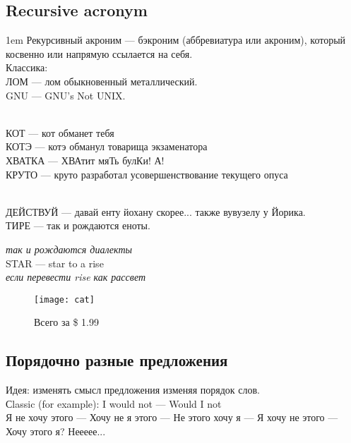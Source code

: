 \subsection{Recursive acronym}
\begin{flushleft}\parskip1em
    Рекурсивный акроним --- бэкроним (аббревиатура или акроним), который косвенно или напрямую ссылается на себя.\\
    Классика:\\
    ЛОМ --- лом обыкновенный металлический.\\
    GNU --- GNU's Not UNIX.

    \emph{}\\
    КОТ --- кот обманет тебя\\
    КОТЭ --- котэ обманул товарища экзаменатора\\
    ХВАТКА --- ХВАтит мяТь булКи! А!\\
    КРУТО --- круто разработал усовершенствование текущего опуса

    \emph{}\\
    ДЕЙСТВУЙ --- давай енту йохану скорее... также вувузелу у Йорика.\\
    ТИРЕ --- так и рождаются еноты.

    \emph{так и рождаются диалекты}\\
    STAR --- star to a rise\\
    \emph{если перевести rise как рассвет}
\end{flushleft}
\begin{figure}[ht!]
    \centering
    \texttt{[image: cat]}
    \caption{Всего за \$ 1.99}
\end{figure}

\subsection{Порядочно разные предложения}
Идея: изменять смысл предложения изменяя порядок слов.\\

Сlassic (for example): I would not --- Would I not\\

Я не хочу этого --- Хочу не я этого --- Не этого хочу я --- Я хочу не этого --- Хочу этого я? Неееее...


